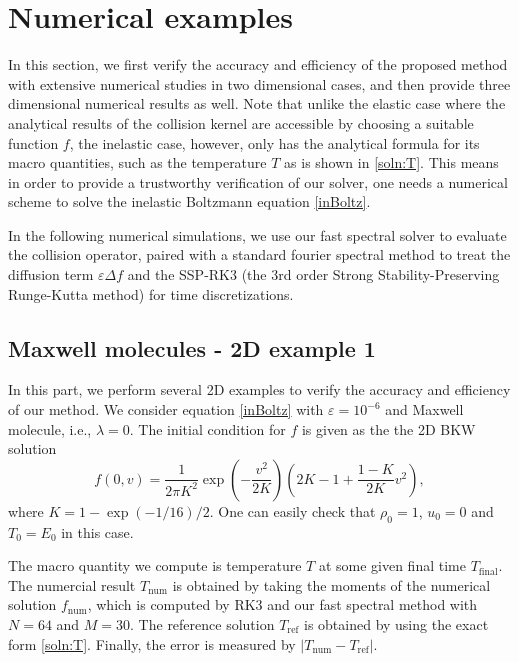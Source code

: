 \documentclass[review, times]{elsarticle}
\begin{document}
\section{Numerical examples}

In this section, we first verify the accuracy and efficiency of the proposed method with extensive numerical studies in two dimensional cases, and then provide three dimensional numerical results as well. Note that unlike the elastic case where the analytical results of the collision kernel are accessible by choosing a suitable function $f$, the inelastic case, however, only has the analytical formula for its macro quantities, such as the temperature $T$ as is shown in \eqref{soln:T}. This means in order to provide a trustworthy verification of our solver, one needs a numerical scheme to solve the inelastic Boltzmann equation \eqref{inBoltz}.


In the following numerical simulations, we use our fast spectral solver to evaluate the collision operator, paired with a standard fourier spectral method to treat the diffusion term $\varepsilon\Delta f$ and the SSP-RK3 (the 3rd order Strong Stability-Preserving Runge-Kutta method) \cite{shuTadmor} for time discretizations.

\subsection{Maxwell molecules - 2D example 1}

In this part, we perform several 2D examples to verify the accuracy and efficiency of our method. We consider equation \eqref{inBoltz} with $\varepsilon = 10^{-6}$ and Maxwell molecule, i.e., $\lambda = 0$. The initial condition for $f$ is given as the the 2D BKW solution
\begin{equation} \label{ext1}
  f(0,v) = \frac{1}{2\pi K^2}\exp\left(-\frac{v^2}{2K}\right)\left(2K-1+\frac{1-K}{2K}v^2\right),
\end{equation}
where $K=1-\exp(-1/16)/2$. One can easily check that $\rho_0 = 1$, $u_0 = 0$ and $T_0 = E_0$ in this case.

The macro quantity we compute is temperature $T$ at some given final time $T_\text{final}$. The numercial result $T_\text{num}$ is obtained by taking the moments of the numerical solution $f_\text{num}$, which is computed by RK3 and our fast spectral method with $N = 64$ and $M = 30$. The reference solution $T_\text{ref}$ is obtained by using the exact form \eqref{soln:T}. Finally, the error is measured by $|T_\text{num} - T_\text{ref}|$.
\end{document}
